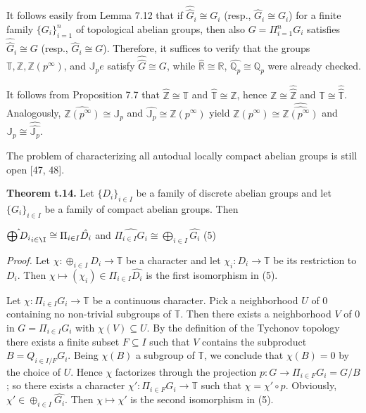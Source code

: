 \documentclass[12pt]{article}
\begin{document}
It follows easily from Lemma 7.12 that if $\hat{\hat{G}}_i \cong G_i$ (resp., $\hat{G}_i \cong G_i$) for a finite family $\{G_i\}^n_{i=1}$ of topological
abelian groups, then also $G = \Pi^n_{i=1} G_i$ satisfies $\hat{\hat{G}}_i \cong G$ (resp., $\hat{G}_i \cong G$). Therefore, it suffices to verify that the
groups $\mathbb{T}, \mathbb{Z}, \mathbb{Z}(p^{\infty})$, and $\mathbb{J}_p e$ satisfy $\hat{\hat{G}} \cong G$, while $\hat{\mathbb{R}} \cong \mathbb{R}$, $\hat{\mathbb{Q}_p} \cong \mathbb{Q}_p$ were already checked.


    It follows from Proposition 7.7 that $\hat{\mathbb{Z}} \cong \mathbb{T}$ and $\hat{\mathbb{T}} \cong \mathbb{Z}$, hence $\mathbb{Z} \cong \hat{\hat{\mathbb{Z}}}$ and $\mathbb{T} \cong \hat{\hat{\mathbb{T}}}$. Analogously, $\hat{\mathbb{Z} (p^{\infty})} \cong \mathbb{J}_p$
and $\hat{\mathbb{J}_p} \cong \mathbb{Z}(p^{\infty})$ yield $\mathbb{Z}(p^{\infty}) \cong \hat{\hat{\mathbb{Z}(p^{\infty})}}$ and $\mathbb{J}_p \cong \hat{\hat{\mathbb{J}_p}}$.


    The problem of characterizing all autodual locally compact abelian groups is still open [47, 48].


\textbf{Theorem t.14.} Let $\{D_i\}_{i \in I}$ be a family of discrete abelian groups and let $\{G_i\}_{i \in I}$ be a family of compact
abelian groups. Then


    $\hat{\bigoplus D_i}_{i \in \I} \cong \Pi_{i \in I} \hat{D_i}$ and $\hat{\Pi_{i \in I} G_i} \cong \bigoplus_{i \in I} \hat{G_i}$ (5)


\emph{Proof.} Let $\chi : \oplus_{i \in I} D_i \to \mathbb{T}$ be a character and let $\chi_i: D_i \to \mathbb{T}$ be its restriction to $D_i$. Then $\chi \mapsto (\chi_i) \in \Pi_{i \in I} \hat{D_i}$
is the first isomorphism in (5).


    Let $\chi : \Pi_{i \in I} G_i \to \mathbb{T}$ be a continuous character. Pick a neighborhood $U$ of 0 containing no non-trivial
subgroups of $\mathbb{T}$. Then there exists a neighborhood $V$ of 0 in $G = \Pi_{i \in I} G_i$ with $\chi(V) \subseteq U$. By the definition of
the Tychonov topology there exists a finite subset $F \subseteq I$ such that $V$ contains the subproduct $B = Q_{i \in I/F} G_i$.
Being $\chi(B)$ a subgroup of $\mathbb{T}$, we conclude that $\chi(B) = 0$ by the choice of $U$. Hence $\chi$ factorizes through the
projection $p : G \to \Pi_{i \in F} G_i = G/B$; so there exists a character $\chi' : \Pi_{i \in F} G_i \to \mathbb{T}$ such that $\chi = \chi' \circ p$.
Obviously, $\chi' \in \oplus_{i \in I} \hat{G_i}$. Then $\chi \mapsto \chi'$ is the second isomorphism in (5).
\end{document}
